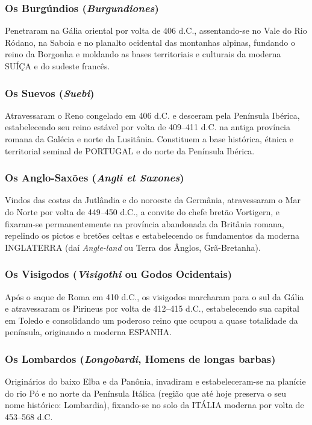 \subsubsection*{Os Burgúndios (\textit{Burgundiones})}
Penetraram na Gália oriental por volta de 406 d.C., assentando-se no Vale do Rio Ródano, na Saboia e no planalto ocidental das montanhas alpinas, fundando o reino da Borgonha e moldando as bases territoriais e culturais da moderna SUÍÇA e do sudeste francês.


\subsubsection*{Os Suevos (\textit{Suebi})}
Atravessaram o Reno congelado em 406 d.C. e desceram pela Península Ibérica, estabelecendo seu reino estável por volta de 409–411 d.C. na antiga província romana da Galécia e norte da Lusitânia. Constituem a base histórica, étnica e territorial seminal de PORTUGAL e do norte da Península Ibérica.


\subsubsection*{Os Anglo-Saxões (\textit{Angli et Saxones})}
Vindos das costas da Jutlândia e do noroeste da Germânia, atravessaram o Mar do Norte por volta de 449–450 d.C., a convite do chefe bretão Vortigern, e fixaram-se permanentemente na província abandonada da Britânia romana, repelindo os pictos e bretões celtas e estabelecendo os fundamentos da moderna INGLATERRA (daí \textit{Angle-land} ou Terra dos Ânglos, Grã-Bretanha).


\subsubsection*{Os Visigodos (\textit{Visigothi} ou Godos Ocidentais)}
Após o saque de Roma em 410 d.C., os visigodos marcharam para o sul da Gália e atravessaram os Pirineus por volta de 412–415 d.C., estabelecendo sua capital em Toledo e consolidando um poderoso reino que ocupou a quase totalidade da península, originando a moderna ESPANHA.


\subsubsection*{Os Lombardos (\textit{Longobardi}, Homens de longas barbas)}
Originários do baixo Elba e da Panônia, invadiram e estabeleceram-se na planície do rio Pó e no norte da Península Itálica (região que até hoje preserva o seu nome histórico: Lombardia), fixando-se no solo da ITÁLIA moderna por volta de 453–568 d.C.


